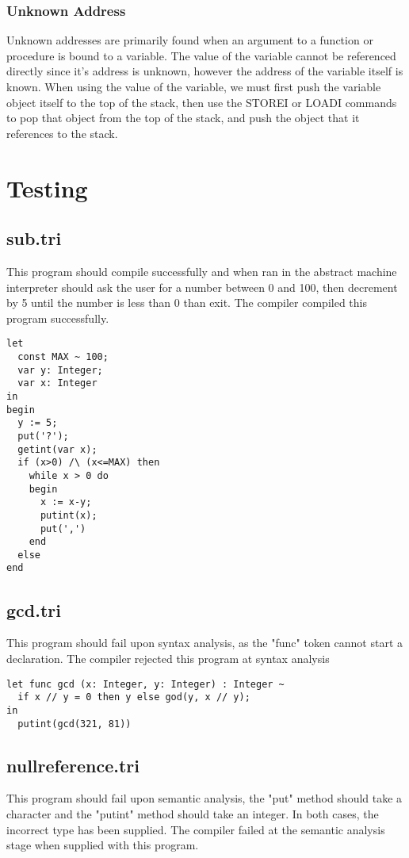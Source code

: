 \documentclass{article}
\begin{document}
\subsubsection{Unknown Address}
Unknown addresses are primarily found when an argument to a function or procedure is bound to a variable. The value of the variable cannot be referenced directly since it's address is unknown, however the address of the variable itself is known. When using the value of the variable, we must first push the variable object itself to the top of the stack, then use the STOREI or LOADI commands to pop that object from the top of the stack, and push the object that it references to the stack.

\section{Testing}
\subsection{sub.tri}
This program should compile successfully and when ran in the abstract machine interpreter should ask the user for a number between 0 and 100, then decrement by 5 until the number is less than 0 than exit. The compiler compiled this program successfully.

\begin{lstlisting}
let
  const MAX ~ 100;
  var y: Integer;
  var x: Integer
in
begin
  y := 5;
  put('?');
  getint(var x);
  if (x>0) /\ (x<=MAX) then
    while x > 0 do 
    begin
      x := x-y;
      putint(x);
      put(',')
    end
  else
end
\end{lstlisting}

\subsection{gcd.tri}
This program should fail upon syntax analysis, as the "func" token cannot start a declaration. The compiler rejected this program at syntax analysis

\begin{lstlisting}
let func gcd (x: Integer, y: Integer) : Integer ~
  if x // y = 0 then y else god(y, x // y);
in
  putint(gcd(321, 81))
\end{lstlisting}

\subsection{nullreference.tri}
This program should fail upon semantic analysis, the "put" method should take a character and the "putint" method should take an integer. In both cases, the incorrect type has been supplied. The compiler failed at the semantic analysis stage when supplied with this program.
\end{document}
